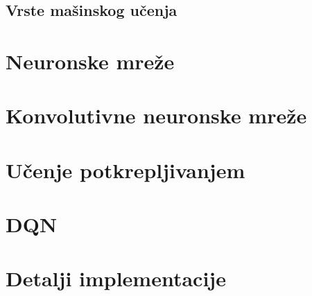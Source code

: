 \documentclass{article}
\begin{document}
\subsection{Vrste mašinskog učenja}

\section{Neuronske mreže}
\section{Konvolutivne neuronske mreže}
\section{Učenje potkrepljivanjem}
\section{DQN}
\section{Detalji implementacije}
\end{document}
